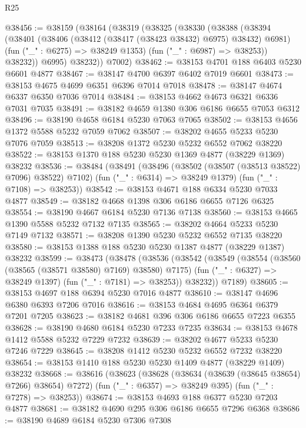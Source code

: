 \begin{lexlean}{R25}
\begin{coremodule}
@38456 := @38159
    (@38164
      (@38319
        (@38325
          (@38330
            (@38388
              (@38394
                (@38401
                  (@38406 (@38412 (@38417 (@38423 @38432) @6975) @38432) @6981)
                  (fun ("_" : @6275) => @38249 @1353)
                  (fun ("_" : @6987) => @38253))
                @38232))
            @6995)
          @38232))
      @7002)
@38462 := @38153 @4701 @188 @6403 @5230 @6601 @4877
@38467 := @38147 @4700 @6397 @6402 @7019 @6601
@38473 := @38153 @4675 @4699 @6351 @6396 @7014 @7018
@38478 := @38147 @4674 @6337 @6350 @7036 @7014
@38484 := @38153 @4662 @4673 @6321 @6336 @7031 @7035
@38491 := @38182 @4659 @1380 @306 @6186 @6655 @7053 @6312
@38496 := @38190 @4658 @6184 @5230 @7063 @7065
@38502 := @38153 @4656 @1372 @5588 @5232 @7059 @7062
@38507 := @38202 @4655 @5233 @5230 @7076 @7059
@38513 := @38208 @1372 @5230 @5232 @6552 @7062 @38220
@38522 := @38153 @1370 @188 @5230 @5230 @1369 @4877 (@38229 @1369) @38232
@38536 := @38484
    (@38491
      (@38496 (@38502 (@38507 (@38513 @38522) @7096) @38522) @7102)
      (fun ("_" : @6314) => @38249 @1379)
      (fun ("_" : @7108) => @38253))
@38542 := @38153 @4671 @188 @6334 @5230 @7033 @4877
@38549 := @38182 @4668 @1398 @306 @6186 @6655 @7126 @6325
@38554 := @38190 @4667 @6184 @5230 @7136 @7138
@38560 := @38153 @4665 @1390 @5588 @5232 @7132 @7135
@38565 := @38202 @4664 @5233 @5230 @7149 @7132
@38571 := @38208 @1390 @5230 @5232 @6552 @7135 @38220
@38580 := @38153 @1388 @188 @5230 @5230 @1387 @4877 (@38229 @1387) @38232
@38599 := @38473
    (@38478
      (@38536
        (@38542
          (@38549
            (@38554 (@38560 (@38565 (@38571 @38580) @7169) @38580) @7175)
            (fun ("_" : @6327) => @38249 @1397)
            (fun ("_" : @7181) => @38253))
          @38232))
      @7189)
@38605 := @38153 @4697 @188 @6394 @5230 @7016 @4877
@38610 := @38147 @4696 @6380 @6393 @7206 @7016
@38616 := @38153 @4684 @4695 @6364 @6379 @7201 @7205
@38623 := @38182 @4681 @396 @306 @6186 @6655 @7223 @6355
@38628 := @38190 @4680 @6184 @5230 @7233 @7235
@38634 := @38153 @4678 @1412 @5588 @5232 @7229 @7232
@38639 := @38202 @4677 @5233 @5230 @7246 @7229
@38645 := @38208 @1412 @5230 @5232 @6552 @7232 @38220
@38654 := @38153 @1410 @188 @5230 @5230 @1409 @4877 (@38229 @1409) @38232
@38668 := @38616
    (@38623
      (@38628 (@38634 (@38639 (@38645 @38654) @7266) @38654) @7272)
      (fun ("_" : @6357) => @38249 @395)
      (fun ("_" : @7278) => @38253))
@38674 := @38153 @4693 @188 @6377 @5230 @7203 @4877
@38681 := @38182 @4690 @295 @306 @6186 @6655 @7296 @6368
@38686 := @38190 @4689 @6184 @5230 @7306 @7308

\end{coremodule}
\end{lexlean}
